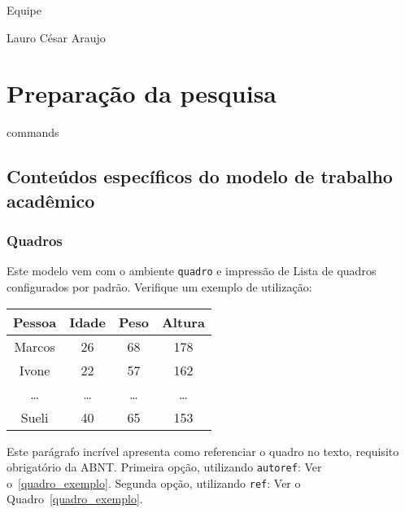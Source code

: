 \documentclass[
    12pt,
openright,             %
    twoside,               %
    a4paper,
french,            %
ngerman,           %
spanish,           %
brazil,            %
british,           %
    ]{abntex2}
\begin{document}
Equipe \abnTeX{}

Lauro César Araujo

\part{Preparação da pesquisa}

{commands}

\chapter{Conteúdos específicos do modelo de trabalho acadêmico}%
\label{cap_trabalho_academico}

\section{Quadros}

Este modelo vem com o ambiente \texttt{quadro} e impressão de Lista de quadros
configurados por padrão. Verifique um exemplo de utilização:

\begin{quadro}[htb]
\caption{%
    \label{quadro_exemplo}Exemplo de quadro}
\begin{tabular}{cccc}
    \toprule
    \textbf{Pessoa} & \textbf{Idade} & \textbf{Peso} & \textbf{Altura} \\
    \midrule
    Marcos          & 26             & 68            & 178             \\
    Ivone           & 22             & 57            & 162             \\
    \ldots          & \ldots         & \ldots        & \ldots          \\
    Sueli           & 40             & 65            & 153             \\
    \bottomrule
\end{tabular}
\end{quadro}

Este parágrafo incrível apresenta como referenciar o quadro no texto, requisito
obrigatório da ABNT.\@
Primeira opção, utilizando \texttt{autoref}: Ver o~\autoref{quadro_exemplo}.
Segunda opção, utilizando \texttt{ref}: Ver o Quadro~\ref{quadro_exemplo}.

\end{document}
